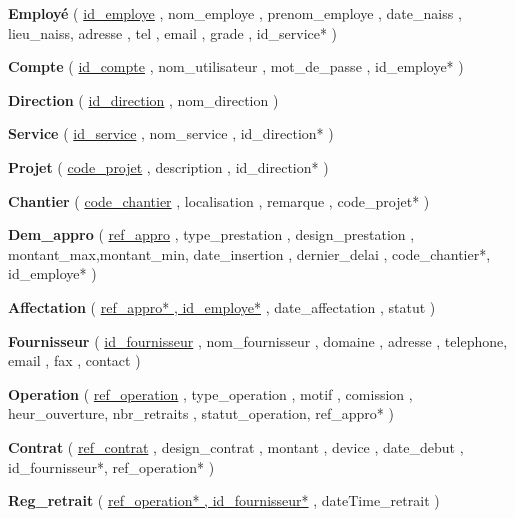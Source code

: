 \documentclass{report}
\begin{document}
\begin{description}
\vspace*{1cm}
    \item \large{\textbf{Employé}} ( \ul{id\_employe} , nom\_employe , prenom\_employe , date\_naiss , lieu\_naiss, adresse , tel , email , grade , id\_service* )\\
    \item \textbf{Compte} ( \ul{id\_compte} , nom\_utilisateur , mot\_de\_passe , id\_employe* )\\
    \item \textbf{Direction} ( \ul{id\_direction} , nom\_direction )\\
    \item \textbf{Service} ( \ul{id\_service} , nom\_service , id\_direction* )\\
    \item \textbf{Projet} ( \ul{code\_projet} , description , id\_direction* )\\
    \item \textbf{Chantier} ( \ul{code\_chantier} , localisation , remarque , code\_projet* )\\
    \item \textbf{Dem\_appro} ( \ul{ref\_appro} , type\_prestation , design\_prestation , montant\_max,montant\_min, date\_insertion , dernier\_delai , code\_chantier*, id\_employe* )\\
    \item \textbf{Affectation} ( \ul{ref\_appro* , id\_employe*} , date\_affectation , statut )\\
    \item \textbf{Fournisseur} ( \ul{id\_fournisseur} , nom\_fournisseur , domaine , adresse , telephone, email , fax , contact )\\
    \item \textbf{Operation} ( \ul{ref\_operation} , type\_operation , motif , comission , heur\_ouverture, nbr\_retraits , statut\_operation, ref\_appro* )\\
    \item \textbf{Contrat} ( \ul{ref\_contrat} , design\_contrat , montant , device , date\_debut , id\_fournisseur*, ref\_operation* )\\
    \item \textbf{Reg\_retrait} ( \ul{ref\_operation* , id\_fournisseur*} , dateTime\_retrait )\\
\end{description}
\vspace{0.7cm}
\end{document}
